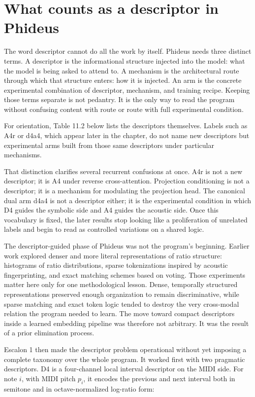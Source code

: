 \section{What counts as a descriptor in Phideus}


The word descriptor cannot do all the work by itself. Phideus needs three distinct terms. A descriptor is the informational structure injected into the model: what the model is being asked to attend to. A mechanism is the architectural route through which that structure enters: how it is injected. An arm is the concrete experimental combination of descriptor, mechanism, and training recipe. Keeping those terms separate is not pedantry. It is the only way to read the program without confusing content with route or route with full experimental condition.

For orientation, Table 11.2 below lists the descriptors themselves. Labels such as A4r or d4a4, which appear later in the chapter, do not name new descriptors but experimental arms built from those same descriptors under particular mechanisms.

That distinction clarifies several recurrent confusions at once. A4r is not a new descriptor; it is A4 under reverse cross-attention. Projection conditioning is not a descriptor; it is a mechanism for modulating the projection head. The canonical dual arm d4a4 is not a descriptor either; it is the experimental condition in which D4 guides the symbolic side and A4 guides the acoustic side. Once this vocabulary is fixed, the later results stop looking like a proliferation of unrelated labels and begin to read as controlled variations on a shared logic.

The descriptor-guided phase of Phideus was not the program's beginning. Earlier work explored denser and more literal representations of ratio structure: histograms of ratio distributions, sparse tokenizations inspired by acoustic fingerprinting, and exact matching schemes based on voting. Those experiments matter here only for one methodological lesson. Dense, temporally structured representations preserved enough organization to remain discriminative, while sparse matching and exact token logic tended to destroy the very cross-modal relation the program needed to learn. The move toward compact descriptors inside a learned embedding pipeline was therefore not arbitrary. It was the result of a prior elimination process.

Escalon 1 then made the descriptor problem operational without yet imposing a complete taxonomy over the whole program. It worked first with two pragmatic descriptors. D4 is a four-channel local interval descriptor on the MIDI side. For note \(i\), with MIDI pitch \(p_i\), it encodes the previous and next interval both in semitone and in octave-normalized log-ratio form:

